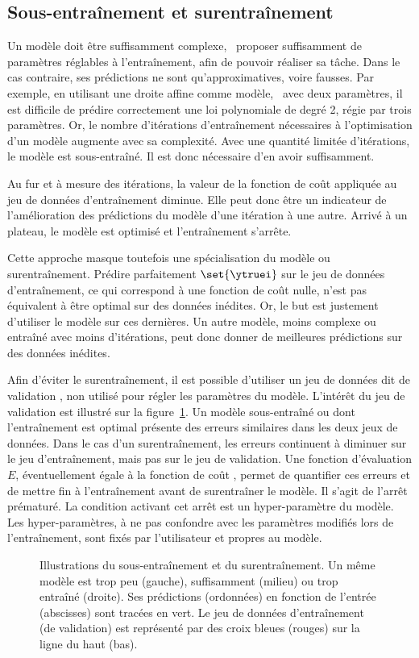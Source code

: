 \subsection{Sous-entraînement et surentraînement}
Un modèle doit être suffisamment complexe,
\ie\ proposer suffisamment de paramètres réglables à l'entraînement,
afin de pouvoir réaliser sa tâche.
Dans le cas contraire, ses prédictions ne sont qu'approximatives, voire fausses.
Par exemple,
en utilisant une droite affine comme modèle, \ie\ avec deux paramètres,
il est difficile de prédire correctement
une loi polynomiale de degré 2, régie par trois paramètres.
Or, le nombre d'itérations d'entraînement nécessaires à l'optimisation d'un modèle augmente avec sa complexité.
Avec une quantité limitée d'itérations, le modèle est sous-entraîné.
Il est donc nécessaire d'en avoir suffisamment.
\par
Au fur et à mesure des itérations,
la valeur de la fonction de coût appliquée au jeu de données d'entraînement diminue.
Elle peut donc être un indicateur de l'amélioration des prédictions du modèle d'une itération à une autre.
Arrivé à un plateau, le modèle est optimisé et l'entraînement s'arrête.
\par
Cette approche masque toutefois une spécialisation du modèle ou surentraînement.
Prédire parfaitement $\set{\ytruei}$ sur le jeu de données d'entraînement,
ce qui correspond à une fonction de coût nulle,
n'est pas équivalent à être optimal sur des données inédites.
Or, le but est justement d'utiliser le modèle sur ces dernières.
Un autre modèle, moins complexe ou entraîné avec moins d'itérations,
peut donc donner de meilleures prédictions sur des données inédites.
\par
Afin d'éviter le surentraînement,
il est possible d'utiliser un jeu de données dit de \og validation \fg,
non utilisé pour régler les paramètres du modèle.
L'intérêt du jeu de validation est illustré sur la figure~\ref{fig-underfitting_and_overfitting}.
Un modèle sous-entraîné ou dont l'entraînement est optimal présente des erreurs similaires dans les deux jeux de données.
Dans le cas d'un surentraînement, les erreurs continuent à diminuer sur le jeu d'entraînement, mais pas sur le jeu de validation.
Une fonction d'évaluation $E$, éventuellement égale à la fonction de coût \Loss, permet de quantifier ces erreurs et de mettre fin à l'entraînement avant de surentraîner le modèle.
Il s'agit de l'arrêt prématuré.
La condition activant cet arrêt est un \og hyper-paramètre \fg{} du modèle.
Les hyper-paramètres,
à ne pas confondre avec les paramètres modifiés lors de l'entraînement,
sont fixés par l'utilisateur et propres au modèle.
\begin{figure}[h]
\centering

\caption[Illustrations du sous-entraînement et du surentraînement.]{Illustrations du sous-entraînement et du surentraînement.
Un même modèle est trop peu (gauche), suffisamment (milieu) ou trop entraîné (droite). Ses prédictions (ordonnées) en fonction de l'entrée (abscisses) sont tracées en vert.
Le jeu de données d'entraînement (de validation) est représenté par des croix bleues (rouges) sur la ligne du haut (bas).}
\label{fig-underfitting_and_overfitting}
\end{figure}